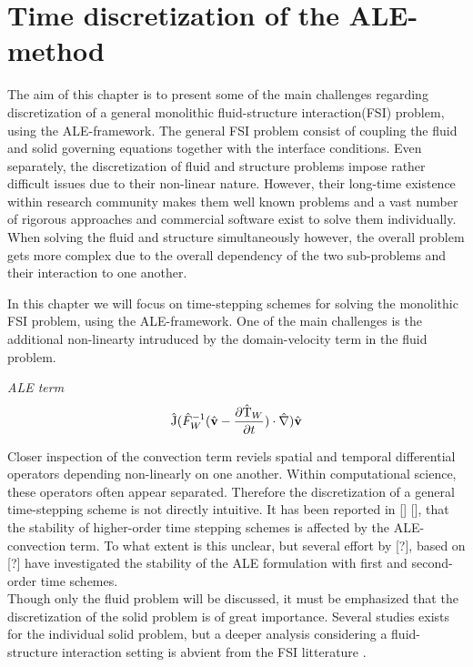 \chapter{Time discretization of the ALE-method}

The aim of this chapter is to present some of the main challenges regarding discretization of a general monolithic fluid-structure interaction(FSI) problem, using the ALE-framework. The general FSI problem consist of coupling the fluid and solid governing equations together with the interface conditions. Even separately, the discretization of fluid and structure problems impose rather difficult issues due to their non-linear nature. However, their long-time existence within research community makes them well known problems and a vast number of rigorous approaches and commercial  software exist to solve them individually. When solving the fluid and structure simultaneously however, the overall problem gets more complex due to the overall dependency of the two sub-problems and their interaction to one another. 

In this chapter we will focus on time-stepping schemes for solving the monolithic FSI problem, using the ALE-framework.   One of the main challenges is the additional non-linearty intruduced by the domain-velocity term in the fluid problem. 
\begin{prob}
\textit{ALE term}\begin{align*}
\text{\^{J}} (\hat{F}_W^{-1}(\hat{\mathbf{v}} - \frac{\partial \text{\^{T}}_W}{\partial t}) \cdot \hat{\nabla}) \hat{\mathbf{v}}
\end{align*} 
\end{prob}
Closer inspection of the convection term reviels spatial and temporal differential operators depending non-linearly on one another. Within computational science, these operators often appear separated. Therefore the discretization of a general time-stepping scheme  is not directly intuitive.
It has been reported in [] [], that the stability of higher-order time stepping schemes is affected by the ALE-convection term. To what extent is this unclear, but several effort by [?], based on [?] have investigated the stability of the ALE formulation with first and second-order time schemes. \\
Though only the fluid problem will be discussed, it must be emphasized that the discretization of the solid problem is of great importance. Several studies exists for the individual solid problem, but a deeper analysis considering a fluid-structure interaction setting is abvient from the FSI litterature \cite{Richter2015}.                                                                                                                                                                                                                       




